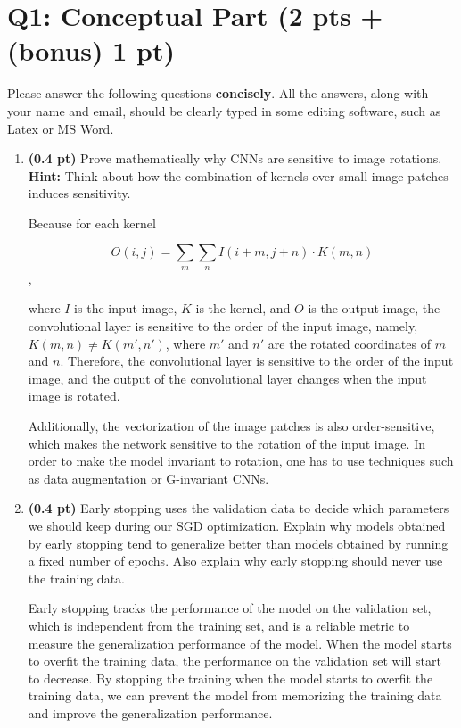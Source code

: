 \section{Q1: Conceptual Part {\bf (2 pts + (bonus) 1 pt)}}

Please answer the following questions \textbf{concisely}. All the answers, along with your name and email, should be clearly typed in some editing software, such as Latex or MS Word.

\begin{enumerate}


\item {\bf (0.4 pt)} Prove mathematically why CNNs are sensitive to image rotations. \\
{\bf Hint:} Think about how the combination of kernels over small image patches induces sensitivity.

Because for each kernel 

$$O(i, j) = \sum_m \sum_n I(i+m, j+n) \cdot K(m, n)$$,

where $I$ is the input image, $K$ is the kernel, and $O$ is the output image,
the convolutional layer is sensitive to the order of the input image, namely,
$K(m, n) \neq K(m', n')$, where $m'$ and $n'$ are the rotated coordinates of $m$
and $n$. Therefore, the convolutional layer is sensitive to the order of the
input image, and the output of the convolutional layer changes when the input
image is rotated.

Additionally, the vectorization of the image patches is also order-sensitive,
which makes the network sensitive to the rotation of the input image. In order
to make the model invariant to rotation, one has to use techniques such as data
augmentation or G-invariant CNNs.

\vspace{3.5in}

\item {\bf (0.4 pt)} Early stopping uses the validation data to decide which parameters we should keep during our SGD optimization. Explain why models obtained by early stopping tend to generalize better than models obtained by running a fixed number of epochs.
Also explain why early stopping should never use the training data.

Early stopping tracks the performance of the model on the validation set, which
is independent from the training set, and is a reliable metric to measure the
generalization performance of the model. When the model starts to overfit the
training data, the performance on the validation set will start to decrease.  By
stopping the training when the model starts to overfit the training data, we can
prevent the model from memorizing the training data and improve the
generalization performance. 


\end{enumerate}
